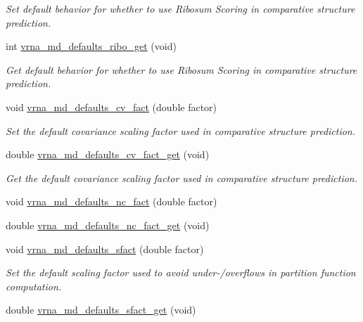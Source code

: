 \begin{DoxyCompactItemize}
\begin{DoxyCompactList}\small\item\em Set default behavior for whether to use Ribosum Scoring in comparative structure prediction. \end{DoxyCompactList}\item 
int \hyperlink{group__model__details_ga169027f0c0561ea7d87b655e4b336bfc}{vrna\-\_\-md\-\_\-defaults\-\_\-ribo\-\_\-get} (void)
\begin{DoxyCompactList}\small\item\em Get default behavior for whether to use Ribosum Scoring in comparative structure prediction. \end{DoxyCompactList}\item 
void \hyperlink{group__model__details_gad3a3f40baafd91a6ce80a91a68e20053}{vrna\-\_\-md\-\_\-defaults\-\_\-cv\-\_\-fact} (double factor)
\begin{DoxyCompactList}\small\item\em Set the default covariance scaling factor used in comparative structure prediction. \end{DoxyCompactList}\item 
double \hyperlink{group__model__details_gae59c68393807217b0a2497adb64d3ee3}{vrna\-\_\-md\-\_\-defaults\-\_\-cv\-\_\-fact\-\_\-get} (void)
\begin{DoxyCompactList}\small\item\em Get the default covariance scaling factor used in comparative structure prediction. \end{DoxyCompactList}\item 
void \hyperlink{group__model__details_gac35e596c850dce3ad55c49119fd7d471}{vrna\-\_\-md\-\_\-defaults\-\_\-nc\-\_\-fact} (double factor)
\item 
double \hyperlink{group__model__details_ga7ac759eaa7159bf5f022745f5da59508}{vrna\-\_\-md\-\_\-defaults\-\_\-nc\-\_\-fact\-\_\-get} (void)
\item 
void \hyperlink{group__model__details_ga3f73d3029d3d0025d4cc311510cd95a3}{vrna\-\_\-md\-\_\-defaults\-\_\-sfact} (double factor)
\begin{DoxyCompactList}\small\item\em Set the default scaling factor used to avoid under-\//overflows in partition function computation. \end{DoxyCompactList}\item 
double \hyperlink{group__model__details_gab2df6aab954b63fd3592d18e90285dae}{vrna\-\_\-md\-\_\-defaults\-\_\-sfact\-\_\-get} (void)

\end{DoxyCompactItemize}
